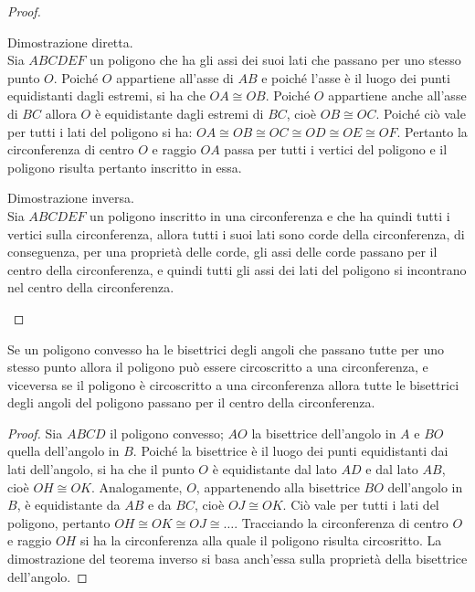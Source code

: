 \begin{proof}~\\
\begin{enumerate*}
\item Dimostrazione diretta.\\
Sia $ABCDEF$ un poligono che ha gli assi dei suoi lati che passano per uno stesso punto $O$. Poiché $O$ appartiene all'asse di $AB$ e poiché l'asse è il luogo dei punti equidistanti dagli estremi, si ha che $OA\cong OB$. Poiché $O$ appartiene anche all'asse di $BC$ allora $O$ è equidistante dagli estremi di $BC$, cioè $OB\cong OC$. Poiché ciò vale per tutti i lati del poligono si ha: $OA\cong OB\cong OC\cong OD\cong OE\cong OF$. Pertanto la circonferenza di centro $O$ e raggio $OA$ passa per tutti i vertici del poligono e il poligono risulta pertanto inscritto in essa.
\item Dimostrazione inversa.\\
Sia $ABCDEF$ un poligono inscritto in una circonferenza e che ha quindi tutti i vertici sulla circonferenza, allora tutti i suoi lati sono corde della circonferenza, di conseguenza, per una proprietà delle corde, gli assi delle corde passano per il centro della circonferenza, e quindi tutti gli assi dei lati del poligono si incontrano nel centro della circonferenza.
\end{enumerate*}
\end{proof}

\begin{teorema}
Se un poligono convesso ha le bisettrici degli angoli che passano tutte per uno stesso punto allora il poligono può essere circoscritto a una circonferenza, e viceversa se il poligono è circoscritto a una circonferenza allora tutte le bisettrici degli angoli del poligono passano per il centro della circonferenza.
\end{teorema}

\begin{proof}
Sia $ABCD$ il poligono convesso; $AO$ la bisettrice dell'angolo in $A$ e $BO$ quella dell'angolo in $B$. Poiché la bisettrice è il luogo dei punti equidistanti dai lati dell'angolo, si ha che il punto $O$ è equidistante dal lato $AD$ e dal lato $AB$, cioè $OH\cong OK$. Analogamente, $O$, appartenendo alla bisettrice $BO$ dell'angolo in $B$, è equidistante da $AB$ e da $BC$, cioè $OJ\cong OK$. Ciò vale per tutti i lati del poligono, pertanto $OH\cong OK\cong OJ\cong \ldots$. Tracciando la circonferenza di centro $O$ e raggio $OH$ si ha la circonferenza alla quale il poligono risulta circosritto.
La dimostrazione del teorema inverso si basa anch’essa sulla proprietà della bisettrice dell’angolo.
\end{proof}


